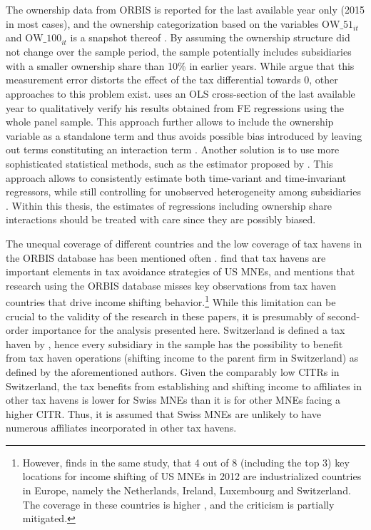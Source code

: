 \documentclass[10pt,twocolumn,oneside,cmyk]{article}
\begin{document}
The ownership data from ORBIS is reported for the last available year only (2015 in most cases), and the ownership categorization based on the variables $\text{OW\_51}_{it}$ and $\text{OW\_100}_{it}$ is a snapshot thereof \parencite[430]{dharmapala_what_2014}. By assuming the ownership structure did not change over the sample period, the sample potentially includes subsidiaries with a smaller ownership share than 10\% in earlier years. While \textcite[76]{budd_wages_2005} argue that this measurement error distorts the effect of the tax differential towards 0, other approaches to this problem exist. \textcite[15, 26]{dischinger_profit_2008} uses an OLS cross-section of the last available year to qualitatively verify his results obtained from FE regressions using the whole panel sample. This approach further allows to include the ownership variable as a standalone term and thus avoids possible bias introduced by leaving out terms constituting an interaction term \parencite[66-68]{brambor_understanding_2006}. Another solution is to use more sophisticated statistical methods, such as the estimator proposed by \textcite{hausman_panel_1981}. This approach allows to consistently estimate both time-variant and time-invariant regressors, while still controlling for unobserved heterogeneity among subsidiaries \parencite[325-326]{wooldridge_introductory_2009}. Within this thesis, the estimates of regressions including ownership share interactions should be treated with care since they are possibly biased.

The unequal coverage of different countries and the low coverage of tax havens in the ORBIS database has been mentioned often \parencites[for example][18]{fuest_tax_2010}[906]{clausing_effect_2016}. \textcite[529-530]{desai_demand_2006} find that tax havens are important elements in tax avoidance strategies of US MNEs, and \textcite[906]{clausing_effect_2016} mentions that research using the ORBIS database misses key observations from tax haven countries that drive income shifting behavior.\footnote{However, \textcite[917]{clausing_effect_2016} finds in the same study, that 4 out of 8 (including the top 3) key locations for income shifting of US MNEs in 2012 are industrialized countries in Europe, namely the Netherlands, Ireland, Luxembourg and Switzerland. The coverage in these countries is higher \parencite[7]{kalemli-ozcan_how_2015}, and the criticism is partially mitigated.} While this limitation can be crucial to the validity of the research in these papers, it is presumably of second-order importance for the analysis presented here. Switzerland is defined a tax haven by \textcite[517]{desai_demand_2006}, hence every subsidiary in the sample has the possibility to benefit from tax haven operations (shifting income to the parent firm in Switzerland) as defined by the aforementioned authors. Given the comparably low CITRs in Switzerland, the tax benefits from establishing and shifting income to affiliates in other tax havens is lower for Swiss MNEs than it is for other MNEs facing a higher CITR. Thus, it is assumed that Swiss MNEs are unlikely to have numerous affiliates incorporated in other tax havens.
\end{document}

